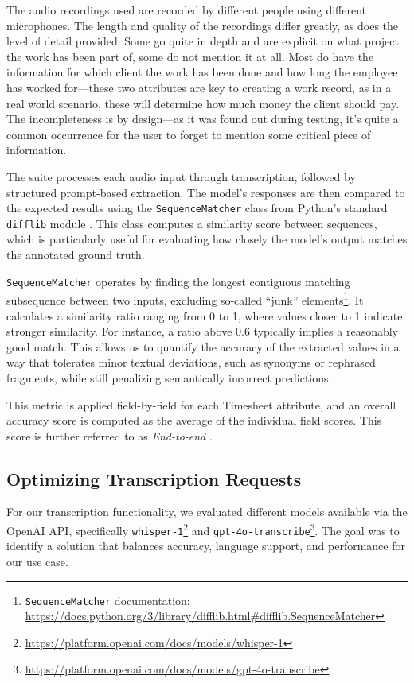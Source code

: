 \documentclass[
  digital,     %
  oneside,     %
  nosansbold,  %
  nocolorbold, %
  lof,         %
  lot,         %
]{fithesis4}
\begin{document}
The audio recordings used are recorded by different people using different microphones. The length and quality of the recordings differ greatly, as does the level of detail provided. Some go quite in depth and are explicit on what project the work has been part of, some do not mention it at all. Most do have the information for which client the work has been done and how long the employee has worked for—these two attributes are key to creating a work record, as in a real world scenario, these will determine how much money the client should pay. The incompleteness is by design—as it was found out during testing, it's quite a common occurrence for the user to forget to mention some critical piece of information.

The suite processes each audio input through transcription, followed by structured prompt-based extraction. The model's responses are then compared to the expected results using the \texttt{SequenceMatcher} class from Python’s standard \texttt{difflib} module \cite{pythonDifflib}. This class computes a similarity score between sequences, which is particularly useful for evaluating how closely the model's output matches the annotated ground truth.

\texttt{SequenceMatcher} operates by finding the longest contiguous matching subsequence between two inputs, excluding so-called “junk” elements\footnote{\texttt{SequenceMatcher} documentation: \url{https://docs.python.org/3/library/difflib.html\#difflib.SequenceMatcher}}. It calculates a similarity ratio ranging from 0 to 1, where values closer to 1 indicate stronger similarity. For instance, a ratio above 0.6 typically implies a reasonably good match. This allows us to quantify the accuracy of the extracted values in a way that tolerates minor textual deviations, such as synonyms or rephrased fragments, while still penalizing semantically incorrect predictions.

This metric is applied field-by-field for each Timesheet attribute, and an overall accuracy score is computed as the average of the individual field scores. This score is further referred to as \emph{End-to-end }.

\subsection{Optimizing Transcription Requests}

For our transcription functionality, we evaluated different models available via the OpenAI \gls{API}, specifically \texttt{whisper-1}\footnote{\url{https://platform.openai.com/docs/models/whisper-1}} and \texttt{gpt-4o-transcribe}\footnote{\url{https://platform.openai.com/docs/models/gpt-4o-transcribe}}. The goal was to identify a solution that balances accuracy, language support, and performance for our use case.
\end{document}
